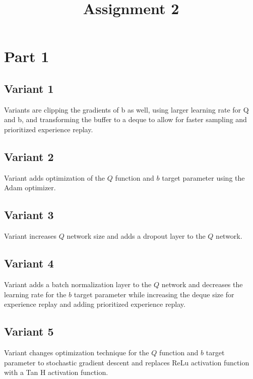 \documentclass{article}
\title{Assignment 2}
\date{}
\author{}
\begin{document}
\maketitle
\section*{Part 1}
\subsection*{Variant 1}
Variants are clipping the gradients of b as well, using larger learning rate for Q and b, and transforming the buffer to a deque to allow for faster sampling and prioritized experience replay.

\subsection*{Variant 2}
Variant adds optimization of the $Q$ function and $b$ target parameter using the Adam optimizer.

\subsection*{Variant 3}
Variant increases $Q$ network size and adds a dropout layer to the $Q$ network.

\subsection*{Variant 4}
Variant adds a batch normalization layer to the $Q$ network and decreases the learning rate for the $b$ target parameter while increasing the deque size for experience replay and adding prioritized experience replay.

\subsection*{Variant 5}
Variant changes optimization technique for the $Q$ function and $b$ target parameter to stochastic gradient descent and replaces ReLu activation function with a Tan H activation function.
\end{document}
